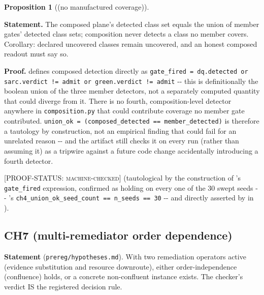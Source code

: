 \documentclass[11pt,a4paper]{article}
\theoremstyle{definition}
\newtheorem{proposition}{Proposition}
\newcommand{\proofstatus}[1]{[\textsc{PROOF-STATUS}: \textsc{#1}]}
\begin{document}
\begin{proposition}[(no manufactured coverage)]
\label{prop:5}

\noindent\textbf{Statement.} The composed plane's detected class set equals the union of member gates' detected class sets; composition never detects a class no member covers. Corollary: declared uncovered classes remain uncovered, and an honest composed readout must say so.

\noindent\textbf{Proof.}  defines composed detection directly as \texttt{gate\_fired = dq.detected or sarc.verdict != admit or green.verdict != admit} -{}- this is definitionally the boolean union of the three member detectors, not a separately computed quantity that could diverge from it. There is no fourth, composition-level detector anywhere in \texttt{composition.py} that could contribute coverage no member gate contributed. \texttt{union\_ok = (composed\_detected == member\_detected)} is therefore a tautology by construction, not an empirical finding that could fail for an unrelated reason -{}- and the artifact still checks it on every run (rather than assuming it) as a tripwire against a future code change accidentally introducing a fourth detector.

\proofstatus{machine-checked} (tautological by the construction of 's \texttt{gate\_fired} expression, confirmed as holding on every one of the 30 swept seeds -{}- 's \texttt{ch4\_union\_ok\_seed\_count == n\_seeds == 30} -{}- and directly asserted by  in ).
\end{proposition}

\subsection*{CH7 (multi-remediator order dependence)}

\noindent\textbf{Statement} (\texttt{prereg/hypotheses.md}). With two remediation operators active (evidence substitution and resource downroute), either order-independence (confluence) holds, or a concrete non-confluent instance exists. The checker's verdict IS the registered decision rule.
\end{document}
